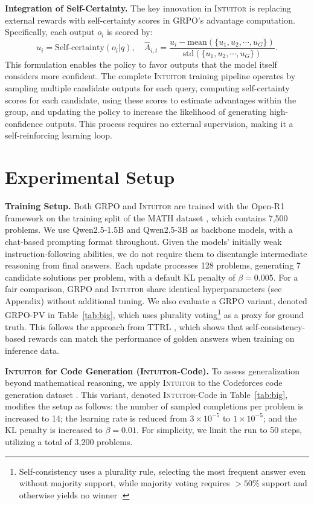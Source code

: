 \documentclass{article} %
\newcommand{\methodname}{\textsc{Intuitor}\xspace}
\begin{document}
\textbf{Integration of Self-Certainty. }
The key innovation in \methodname is replacing external rewards with self-certainty scores in GRPO's advantage computation. Specifically, each output $o_i$ is scored by:
\begin{equation}
u_i = \text{Self-certainty}(o_i|q), \quad
\hat{A}_{i,t} = \frac{u_i - \text{mean}(\{u_1, u_2, \cdots, u_G\})}
{\text{std}(\{u_1, u_2, \cdots, u_G\})}.
\label{eq:spo_reward}
\end{equation}
This formulation enables the policy to favor outputs that the model itself considers more confident. The complete \methodname training pipeline operates by sampling multiple candidate outputs for each query, computing self-certainty scores for each candidate, using these scores to estimate advantages within the group, and updating the policy to increase the likelihood of generating high-confidence outputs. This process requires no external supervision, making it a self-reinforcing learning loop.

\section{Experimental Setup}

\textbf{Training Setup. }
Both GRPO and \methodname are trained with the Open-R1 framework \citep{openr1} on the training split of the MATH dataset \citep{hendrycks2021measuring}, which contains 7,500 problems. We use Qwen2.5-1.5B and Qwen2.5-3B \citep{qwen2.5} as backbone models, with a chat-based prompting format throughout. Given the models’ initially weak instruction-following abilities, we do not require them to disentangle intermediate reasoning from final answers. Each update processes 128 problems, generating 7 candidate solutions per problem, with a default KL penalty of \(\beta = 0.005\). For a fair comparison, GRPO and \methodname share identical hyperparameters (see Appendix) without additional tuning. We also evaluate a GRPO variant, denoted GRPO-PV in Table~\ref{tab:big}, which uses plurality voting\footnote{Self-consistency uses a plurality rule, selecting the most frequent answer even without majority support, while majority voting requires \(> 50\%\) support and otherwise yields no winner \citep{de2014essai}.} as a proxy for ground truth. This follows the approach from TTRL \citep{zuo2025ttrl}, which shows that self-consistency-based rewards can match the performance of golden answers when training on inference data.

\textbf{\methodname for Code Generation (\methodname-Code). }
To assess generalization beyond mathematical reasoning, we apply \methodname to the Codeforces code generation dataset \citep{li2022competition}. This variant, denoted \methodname-Code in Table~\ref{tab:big}, modifies the setup as follows: the number of sampled completions per problem is increased to 14; the learning rate is reduced from \(3 \times 10^{-5}\) to \(1 \times 10^{-5}\); and the KL penalty is increased to \(\beta = 0.01\). For simplicity, we limit the run to 50 steps, utilizing a total of 3,200 problems.
\end{document}
